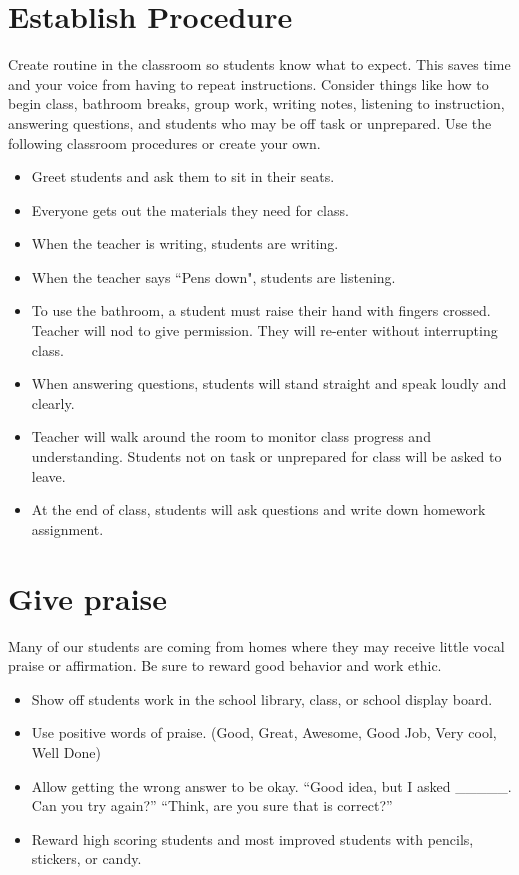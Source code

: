 \section{Establish Procedure}

Create routine in the classroom so students know what to expect.  This saves time and your voice from having to repeat instructions.   Consider things like how to begin class, bathroom breaks, group work, writing notes, listening to instruction, answering questions, and students who may be off task or unprepared. Use the following classroom procedures or create your own. 

\begin{itemize}
 \item Greet students and ask them to sit in their seats.
 \item Everyone gets out the materials they need for class.
 \item When the teacher is writing, students are writing.
 \item When the teacher says ``Pens down", students are listening.
 \item To use the bathroom, a student must raise their hand with fingers crossed.  Teacher will nod to give permission.  They will re-enter without interrupting class.
 \item When answering questions, students will stand straight and speak loudly and clearly.
 \item Teacher will walk around the room to monitor class progress and understanding.  Students not on task or unprepared for class will be asked to leave.
 \item At the end of class, students will ask questions and write down homework assignment.
\end{itemize}

\section{Give praise}
Many of our students are coming from homes where they may receive little vocal praise or affirmation.  Be sure to reward good behavior and work ethic.

\begin{itemize}
 \item Show off students work in the school library, class, or school display board.
 \item Use positive words of praise.  (Good, Great, Awesome, Good Job, Very cool, Well Done)
 \item Allow getting the wrong answer to be okay. ``Good idea, but I asked \_\_\_\_\_. Can you try again?'' ``Think, are you sure that is correct?''  
 \item Reward high scoring students and most improved students with pencils, stickers, or candy.
\end{itemize}

